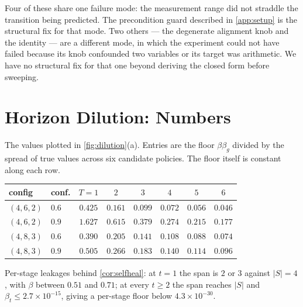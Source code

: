 Four of these share one failure mode: the measurement range did not straddle the
transition being predicted. The precondition guard described in \cref{app:setup}
is the structural fix for that mode. Two others --- the degenerate alignment knob
and the identity --- are a different mode, in which the experiment could not have
failed because its knob confounded two variables or its target was arithmetic. We
have no structural fix for that one beyond deriving the closed form before
sweeping.

\section{Horizon Dilution: Numbers}
\label{app:dilution}

The values plotted in \cref{fig:dilution}(a). Entries are the floor
$\beta\beta_g$ divided by the spread of true values across six candidate
policies. The floor itself is constant along each row.

\begin{center}\small
\begin{tabular}{@{}llcccccc@{}}
\toprule
config & conf. & $T{=}1$ & $2$ & $3$ & $4$ & $5$ & $6$ \\
\midrule
$(4,6,2)$ & $0.6$ & $0.425$ & $0.161$ & $0.099$ & $0.072$ & $0.056$ & $0.046$ \\
$(4,6,2)$ & $0.9$ & $\mathbf{1.627}$ & $0.615$ & $0.379$ & $0.274$ & $0.215$ & $0.177$ \\
$(4,8,3)$ & $0.6$ & $0.390$ & $0.205$ & $0.141$ & $0.108$ & $0.088$ & $0.074$ \\
$(4,8,3)$ & $0.9$ & $0.505$ & $0.266$ & $0.183$ & $0.140$ & $0.114$ & $0.096$ \\
\bottomrule
\end{tabular}
\end{center}

Per-stage leakages behind \cref{cor:selfheal}: at $t=1$ the span is $2$ or $3$
against $|S|=4$, with $\beta$ between $0.51$ and $0.71$; at every $t \ge 2$ the
span reaches $|S|$ and $\beta_t \le 2.7\times10^{-15}$, giving a per-stage floor
below $4.3\times10^{-30}$.
